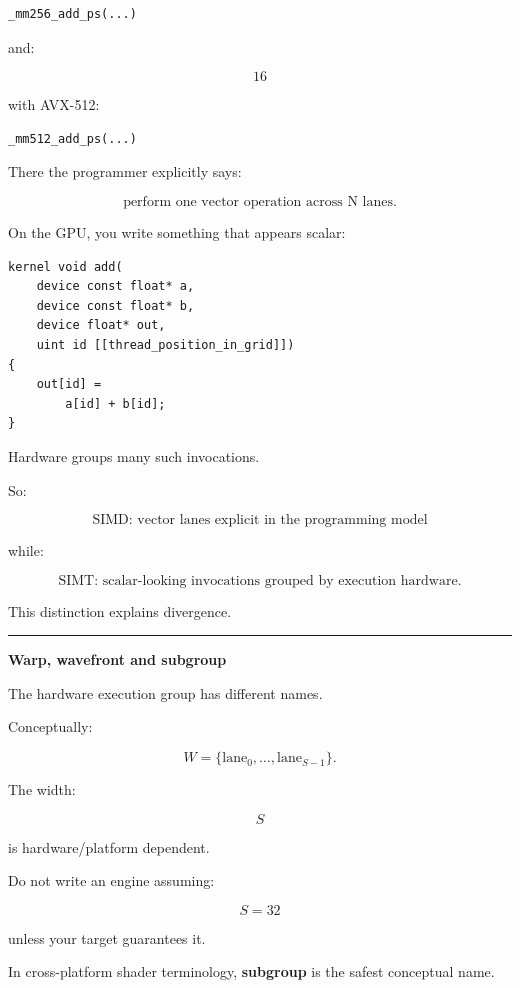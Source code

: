 \protect{}\label{qpohrx}%
\begin{verbatim}
_mm256_add_ps(...)
\end{verbatim}

and:

\[
16
\]

with AVX-512:

\protect{}\label{6vk2sf}%
\begin{verbatim}
_mm512_add_ps(...)
\end{verbatim}

There the programmer explicitly says:

\[
\boxed{\text{perform one vector operation across N lanes}.}
\]

On the GPU, you write something that appears scalar:

\protect{}\label{2o38s4}%
\begin{verbatim}
kernel void add(
    device const float* a,
    device const float* b,
    device float* out,
    uint id [[thread_position_in_grid]])
{
    out[id] =
        a[id] + b[id];
}
\end{verbatim}

Hardware groups many such invocations.

So:

\[
\boxed{
\text{SIMD: vector lanes explicit in the programming model}
}
\]

while:

\[
\boxed{
\text{SIMT: scalar-looking invocations grouped by execution hardware}.
}
\]

This distinction explains divergence.

\begin{center}\rule{0.5\linewidth}{0.5pt}\end{center}

\textbf{Warp, wavefront and subgroup}

The hardware execution group has different names.

Conceptually:

\[
\boxed{
W=\{\text{lane}_0,\dots,\text{lane}_{S-1}\}.
}
\]

The width:

\[
S
\]

is hardware/platform dependent.

Do not write an engine assuming:

\[
S=32
\]

unless your target guarantees it.

In cross-platform shader terminology, \textbf{subgroup} is the safest conceptual name.


